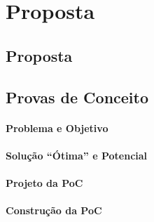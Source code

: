 \chapter{Proposta}
\label{cap-proposta}

\section{Proposta}
\label{prop-sig}



\section{Provas de Conceito}
\label{prop-pocs}

\subsubsection*{Problema e Objetivo}

\subsubsection*{Solução ``Ótima'' e Potencial}

\subsubsection*{Projeto da PoC}

\subsubsection*{Construção da PoC}


